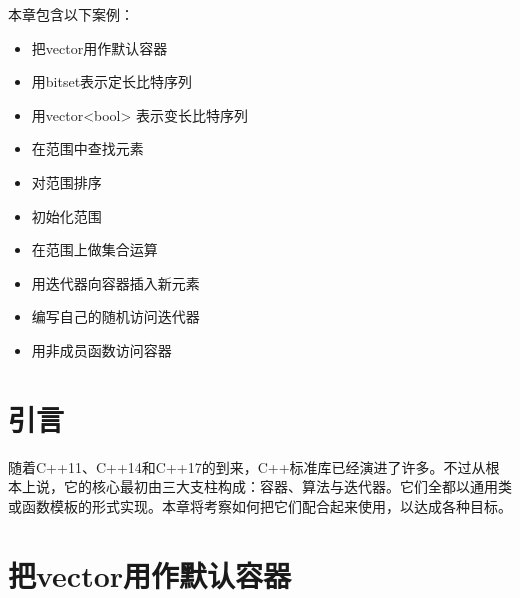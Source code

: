 
本章包含以下案例：



\begin{itemize}
\item 把vector用作默认容器



\item 用bitset表示定长比特序列



\item 用vector<bool> 表示变长比特序列



\item 在范围中查找元素



\item 对范围排序



\item 初始化范围



\item 在范围上做集合运算



\item 用迭代器向容器插入新元素



\item 编写自己的随机访问迭代器



\item 用非成员函数访问容器

\end{itemize}



\section{引言}



随着C++11、C++14和C++17的到来，C++标准库已经演进了许多。不过从根本上说，它的核心最初由三大支柱构成：容器、算法与迭代器。它们全都以通用类或函数模板的形式实现。本章将考察如何把它们配合起来使用，以达成各种目标。



\section{把vector用作默认容器}


